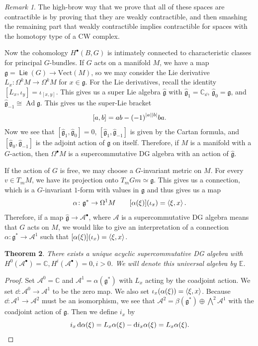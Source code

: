 \documentclass[leqno, openany]{memoir}
\newtheorem{thm}{Theorem}[section]
\theoremstyle{definition}
\theoremstyle{remark}
\newtheorem{rmk}[thm]{Remark}
\theoremstyle{plain}
\theoremstyle{definition}
\theoremstyle{remark}
\newcommand{\C}{\mathbb{C}}
\newcommand{\mc}[1]{\mathcal{#1}}
\newcommand{\mf}[1]{\mathfrak{#1}}
\newcommand{\mr}[1]{\mathrm{#1}}
\newcommand{\wh}[1]{\widehat{#1}}
\DeclareMathOperator{\Ad}{Ad}
\DeclareMathOperator{\Lie}{\mathsf{Lie}}
\begin{document}
\begin{rmk} The high-brow way that we prove that all of these spaces are
    contractible is by proving that they are weakly contractible, and then
    smashing the remaining part that weakly contractible implies contractible
    for spaces with the homotopy type of a CW complex.  \end{rmk}

Now the cohomology $H^{\bullet}(B, G)$ is intimately connected to
characteristic classes for principal $G$-bundles. If $G$ acts on a manifold
$M$, we have a map $\mf{g} = \Lie(G) \to \mr{Vect}(M)$, so we may consider the
Lie derivative $L_x \colon \Omega^k M \to \Omega^k M$ for $x \in \mf{g}$. For
the Lie derivatives, recall the identity $[L_x, \iota_y] = \iota_{[x,y]}$. This
gives us a super Lie algebra $\wh{\mf{g}}$ with $\wh{\mf{g}}_1 = \C_{\dd}$,
$\wh{\mf{g}}_0 = \mf{g}$, and $\wh{\mf{g}}_{-1} \cong \Ad \mf{g}$. This gives
us the super-Lie bracket \[ [a,b] = ab - {(-1)}^{\abs{a} \abs{b}} ba. \] Now we
see that $[\wh{\mf{g}}_1, \wh{\mf{g}}_0] = 0$, $[\wh{\mf{g}}_1,
\wh{\mf{g}}_{-1}]$ is given by the Cartan formula, and $[\wh{\mf{g}}_0,
\wh{\mf{g}}_{-1}]$ is the adjoint action of $\mf{g}$ on itself. Therefore, if
$M$ is a manifold with a $G$-action, then $\Omega^{\bullet} M$ is a
supercommutative DG algebra with an action of $\wh{\mf{g}}$.

If the action of $G$ is free, we may choose a $G$-invariant metric on $M$. For
every $v \in T_m M$, we have its projection onto $T_m Gm \simeq \mf{g}$. This
gives us a connection, which is a $G$-invariant $1$-form with values in
$\mf{g}$ and thus gives us a map \[ \alpha \colon \mf{g}^* \to \Omega^1 M
\qquad [\alpha(\xi)] (\iota_x) = \ev{\xi, x}. \] Therefore, if a map
$\wh{\mf{g}} \to \mc{A}^{\bullet}$, where $\mc{A}$ is a supercommutative DG
algebra means that $G$ acts on $M$, we would like to give an interpretation of
a connection $\alpha \colon \mf{g}^* \to \mc{A}^1$ such that $[\alpha(\xi)]
(\iota_x) = \ev{\xi, x}$.

\begin{thm} There exists a unique acyclic supercommutative DG algebra with
$H^0(\mc{A}^{\bullet}) = \C, H^i(\mc{A}^{\bullet}) = 0, i > 0$. We will denote
this universal algebra by $\mathbb{E}$.  \end{thm}

\begin{proof} Set $\mc{A}^0 = \C$ and $\mc{A}^1 = \alpha(\mf{g}^*)$ with $L_x$
    acting by the coadjoint action. We set $\dd \colon \mc{A}^0 \to \mc{A}^1$
    to be the zero map. We also set $\iota_x(\alpha(\xi)) = \ev{\xi, x}$.
    Because $\dd \colon \mc{A}^1 \to \mc{A}^2$ must be an isomorphism, we see
    that $\mc{A}^2 = \beta(\mf{g}^*) \oplus \bigwedge^2 \mc{A}^1$ with the
    coadjoint action of $\mf{g}$. Then we define $i_x$ by \[ i_x
    \dd{\alpha(\xi)} = L_x \alpha(\xi) - \dd i_x \alpha(\xi) = L_x \alpha(\xi).
\qedhere \] \end{proof}
\end{document}
